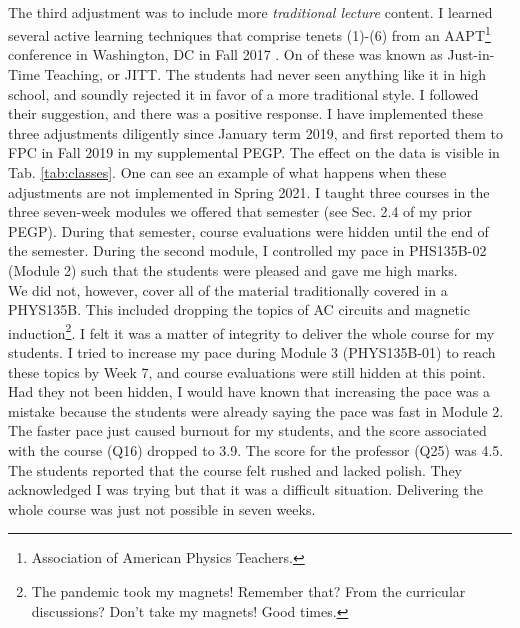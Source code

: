 \documentclass[../../../main.tex]{subfiles}
\begin{document}
\\
\vspace{0.25cm}
The third adjustment was to include more \textit{traditional lecture} content.  I learned several active learning techniques that comprise tenets (1)-(6) from an AAPT\footnote{Association of American Physics Teachers.} conference in Washington, DC in Fall 2017 \cite{AAPTPI}.  On of these was known as Just-in-Time Teaching, or JITT.  The students had never seen anything like it in high school, and soundly rejected it in favor of a more traditional style.  I followed their suggestion, and there was a positive response.  I have implemented these three adjustments diligently since January term 2019, and first reported them to FPC in Fall 2019 in my supplemental PEGP.  The effect on the data is visible in Tab. \ref{tab:classes}.  One can see an example of what happens when these adjustments are not implemented in Spring 2021.  I taught three courses in the three seven-week modules we offered that semester (see Sec. 2.4 of my prior PEGP).  During that semester, course evaluations were hidden until the end of the semester.  During the second module, I controlled my pace in PHS135B-02 (Module 2) such that the students were pleased and gave me high marks.
\\
\vspace{0.25cm}
We did not, however, cover all of the material traditionally covered in a PHYS135B.  This included dropping the topics of AC circuits and magnetic induction\footnote{The pandemic took my magnets!  Remember that?  From the curricular discussions?  Don't take my magnets!  Good times.}.  I felt it was a matter of integrity to deliver the whole course for my students. I tried to increase my pace during Module 3 (PHYS135B-01) to reach these topics by Week 7, and course evaluations were still hidden at this point.  Had they not been hidden, I would have known that increasing the pace was a mistake because the students were already saying the pace was fast in Module 2.  The faster pace just caused burnout for my students, and the score associated with the course (Q16) dropped to 3.9.  The score for the professor (Q25) was 4.5.  The students reported that the course felt rushed and lacked polish.  They acknowledged I was trying but that it was a difficult situation.  Delivering the whole course was just not possible in seven weeks.
\\
\vspace{0.25cm}
\end{document}
